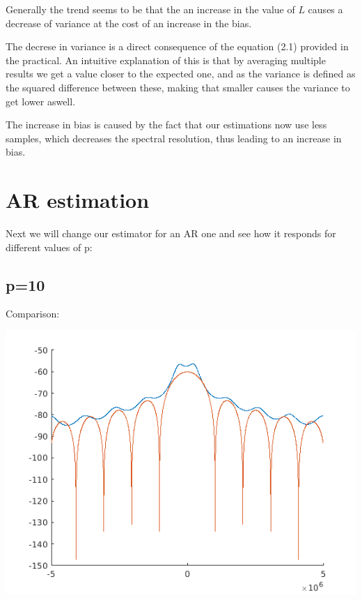 \documentclass[conference,9pt]{IEEEtran}
\begin{document}
Generally the trend seems to be that the an increase in the value of $L$ causes a decrease of variance at the cost of an increase in the bias.


The decrese in variance is a direct consequence of the equation (2.1) provided in the practical. An intuitive explanation of this is that by averaging multiple results we get a value closer to the expected one, and as the variance is defined as the squared difference between these, making that smaller causes the variance to get lower aswell.

The increase in bias is caused by the fact that our estimations now use less samples, which decreases the spectral resolution, thus leading to an increase in bias.

\section{AR estimation}
Next we will change our estimator for an AR one and see how it responds for different values of p:

\subsection{p=10}
Comparison:

\includegraphics[scale=0.6]{arp10.png}
\end{document}

